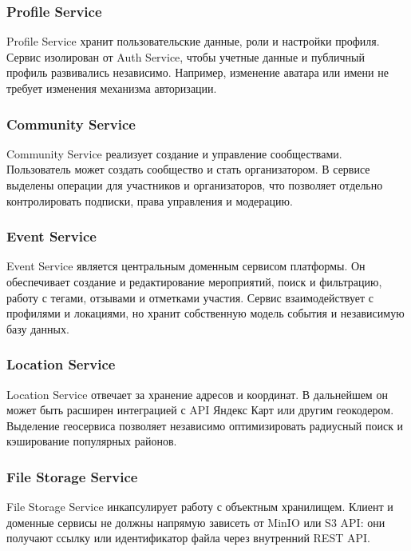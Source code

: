 \subsubsection{Profile Service}

Profile Service хранит пользовательские данные, роли и настройки профиля. Сервис изолирован от Auth Service, чтобы учетные данные и публичный профиль развивались независимо. Например, изменение аватара или имени не требует изменения механизма авторизации.

\subsubsection{Community Service}

Community Service реализует создание и управление сообществами. Пользователь может создать сообщество и стать организатором. В сервисе выделены операции для участников и организаторов, что позволяет отдельно контролировать подписки, права управления и модерацию.

\subsubsection{Event Service}

Event Service является центральным доменным сервисом платформы. Он обеспечивает создание и редактирование мероприятий, поиск и фильтрацию, работу с тегами, отзывами и отметками участия. Сервис взаимодействует с профилями и локациями, но хранит собственную модель события и независимую базу данных.

\subsubsection{Location Service}

Location Service отвечает за хранение адресов и координат. В дальнейшем он может быть расширен интеграцией с API Яндекс Карт или другим геокодером. Выделение геосервиса позволяет независимо оптимизировать радиусный поиск и кэширование популярных районов.

\subsubsection{File Storage Service}

File Storage Service инкапсулирует работу с объектным хранилищем. Клиент и доменные сервисы не должны напрямую зависеть от MinIO или S3 API: они получают ссылку или идентификатор файла через внутренний REST API.

